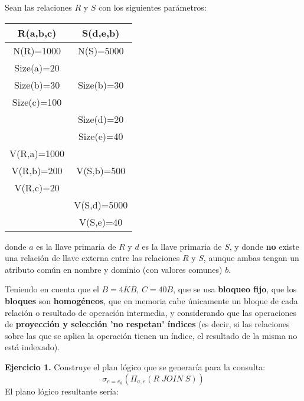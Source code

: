 \documentclass[12pt]{report}
\begin{document}
Sean las relaciones $R$ y $S$ con los siguientes parámetros:

\begin{center}
\begin{tabular}{|c|c|}
\hline 
R(a,b,c) & S(d,e,b) \\ 
\hline 
N(R)=1000 & N(S)=5000 \\ 
\hline 
Size(a)=20 &   \\ 
\hline 
Size(b)=30 & Size(b)=30 \\ 
\hline 
Size(c)=100 &   \\ 
\hline 
  & Size(d)=20 \\ 
\hline 
  & Size(e)=40 \\ 
\hline 
V(R,a)=1000 &   \\ 
\hline 
V(R,b)=200 & V(S,b)=500 \\ 
\hline 
V(R,c)=20 &   \\ 
\hline 
  & V(S,d)=5000 \\ 
\hline 
  & V(S,e)=40 \\ 
\hline 
\end{tabular} 
\end{center}
donde $a$ es la llave primaria de $R$ y $d$ es la llave primaria de $S$, y donde \textbf{no} existe una relación de llave externa entre las relaciones $R$ y $S$, aunque ambas tengan un atributo común en nombre y dominio (con valores comunes) $b$.

Teniendo en cuenta que el $B=4KB$, $C=40B$, que se usa \textbf{bloqueo fijo}, que los \textbf{bloques} son \textbf{homogéneos}, que en memoria cabe únicamente un bloque de cada relación o resultado de operación intermedia, y considerando que las operaciones de \textbf{proyección y selección 'no respetan' índices} (es decir, si las relaciones sobre las que se aplica la operación tienen un índice, el resultado de la misma no está indexado).

\textbf{Ejercicio 1.} Construye el plan lógico que se generaría para la consulta:
\[
\sigma_{e=e_k}\left(\Pi_{a,e}(R\;JOIN\;S)\right)
\]
El plano lógico resultante sería:
\begin{center}
\end{center}
\end{document}
